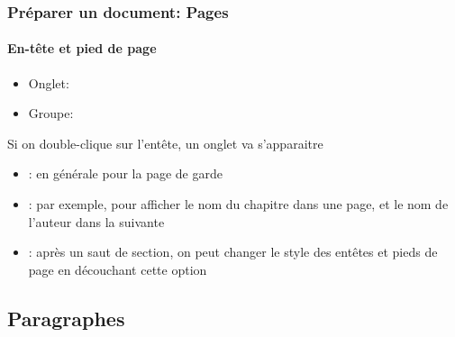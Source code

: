 \documentclass[xcolor=table]{beamer}
\begin{document}
\begin{frame}
\frametitle{Préparer un document: Pages}
\framesubtitle{En-tête et pied de page}

\begin{minipage}{0.78\textwidth}
	\begin{itemize}
		\item Onglet:  
		\item Groupe: 
	\end{itemize}
\end{minipage}
\begin{minipage}{0.2\textwidth}
\end{minipage}

\vspace{6pt}
Si on double-clique sur l'entête, un onglet va s'apparaitre
\begin{itemize}
	\item {}: en générale pour la page de garde 
	\item {}: par exemple, pour afficher le nom du chapitre dans une page, et le nom de l'auteur dans la suivante
	\item {}: après un saut de section, on peut changer le style des entêtes et pieds de page en découchant cette option
\end{itemize}


\end{frame}


\subsection{Paragraphes}
\end{document}
